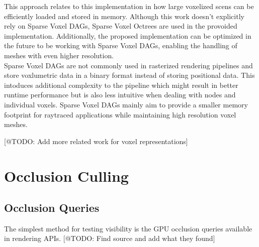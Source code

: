 \noindent
This approach relates to this implementation in how large voxelized scens can be efficiently loaded and stored in 
memory. Although this work doesn't explicitly rely on Sparse Voxel \ac{DAG}s, Sparse Voxel Octrees are used in the 
provoided implementation. Additionally, the proposed implementation can be optimized in the future to be working 
with Sparse Voxel \ac{DAG}s, enabling the handling of meshes with even higher resolution. \\

\noindent
Sparse Voxel \ac{DAG}s are not commonly used in rasterized rendering pipelines and store voxlumetric data in a binary 
format instead of storing positional data. This intoduces additional complexity to the pipeline which might result in 
better runtime performance but is also less intuitive when dealing with nodes and individual voxels. Sparse Voxel 
\ac{DAG}s mainly aim to provide a smaller memory footprint for raytraced applications while maintaining high resolution 
voxel meshes.


[@TODO: Add more related work for voxel representations]

\section*{Occlusion Culling}


\subsection*{Occlusion Queries}

The simplest method for testing visibility is the \ac{GPU} occlusion queries available in rendering \ac{API}s.
[@TODO: Find source and add what they found]

